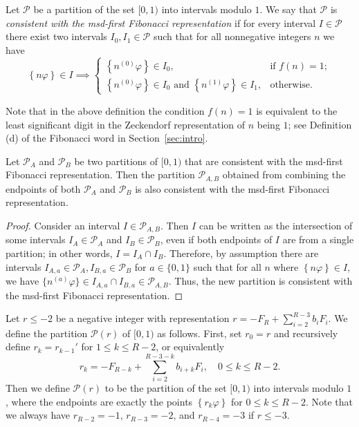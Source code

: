 \documentclass[12pt,runningheads]{llncs}
\newcommand{\cP}{\mathcal{P}}
\renewcommand{\phi}{\varphi}
\newcommand{\fract}[1]{\left\{ #1 \right\}}
\newcommand{\nzero}{n^{(0)}}
\newcommand{\none}{n^{(1)}}
\newcommand{\ndelta}{n^{(a)}}
\begin{document}
\begin{definition}
Let $\cP$ be a partition of the set $[0,1)$ into intervals modulo $1$.
We say that $\cP$ is \emph{consistent with the msd-first Fibonacci representation}
if for every interval $I\in \cP$ there exist two intervals $I_0, I_1 \in \cP$ such that for all nonnegative integers $n$ we have
\[
    \fract{n \phi} \in I 
    \implies 
    \begin{cases}
        \fract{\nzero \phi} \in I_0, &\text{if } f(n) = 1;\\
        \fract{\nzero \phi} \in I_0 \text{ and } \fract{\none \phi} \in I_1,
        &\text{otherwise}.
    \end{cases}
\]
\end{definition}

Note that in the above definition the condition $f(n) = 1$ is equivalent to the least significant digit in the Zeckendorf representation of $n$ being $1$; see Definition (d) of the Fibonacci word in Section~\ref{sec:intro}.


\begin{lemma} \label{lemma:partition-intersection-property}
    Let $\cP_A$ and $\cP_B$ be two partitions of $[0,1)$ that are consistent with the msd-first Fibonacci representation. Then the partition $\cP_{A,B}$ obtained from combining the endpoints of both $\cP_A$ and $\cP_B$ is also consistent with the msd-first Fibonacci representation.
\end{lemma}

\begin{proof}
    Consider an interval $I \in \cP_{A,B}$. Then $I$ can be written as the intersection of some intervals $I_A \in \cP_A$ and $I_B \in \cP_B$, even if both endpoints of $I$ are from a single partition; in other words, $I = I_A \cap I_B$. Therefore, by assumption there are intervals $I_{A, a} \in \cP_A, I_{B, a} \in \cP_B$ for $a \in \{0, 1\}$ such that for all $n$ where $\fract{n\phi} \in I$, we have $\{\ndelta \phi\} \in I_{A, a} \cap I_{B, a} \in \cP_{A,B}$. Thus, the new partition is consistent with the msd-first Fibonacci representation.
\end{proof}

\begin{definition} \label{def:msd-partition}
    Let $r\leq -2$ be a negative integer with representation $r = - F_R + \sum_{i=2}^{R-3} b_i F_i$. We define the partition $\cP(r)$ of $[0,1)$ as follows. First, set $r_0 = r$ and recursively define $r_{k} = r_{k-1}'$ for $1 \leq k \leq R-2$, or equivalently
\[
    r_k = -F_{R-k} + \sum_{i=2}^{R-3-k} b_{i+k} F_{i},
    \quad 0\leq k \leq R-2.
\] Then we define $\cP(r)$ to be the partition of the set $[0,1)$ into intervals modulo $1$, where the endpoints are exactly the points $\fract{r_k \phi}$ for $0 \leq k \leq R-2$. Note that we always have $r_{R-2} = -1$, $r_{R-3} = -2$, and $r_{R-4} = -3$ if $r \leq -3$.

\end{definition}
\end{document}
